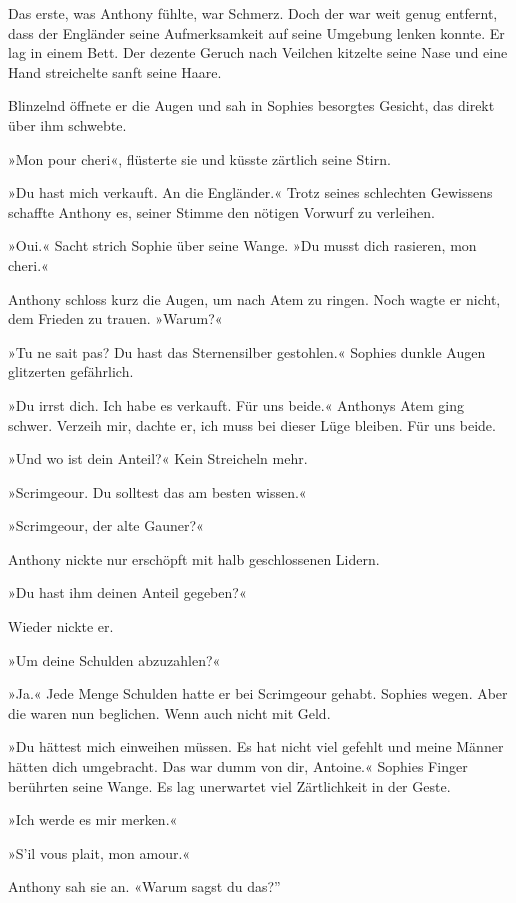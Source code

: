 \tb

Das erste, was Anthony fühlte, war Schmerz. Doch der war weit genug
entfernt, dass der Engländer seine Aufmerksamkeit auf seine
Umgebung lenken konnte. Er lag in einem Bett. Der dezente Geruch
nach Veilchen kitzelte seine Nase und eine Hand streichelte sanft
seine Haare.

Blinzelnd öffnete er die Augen und sah in Sophies besorgtes
Gesicht, das direkt über ihm schwebte.

»Mon pour cheri«, flüsterte sie und küsste zärtlich seine Stirn.

»Du hast mich verkauft. An die Engländer.« Trotz seines schlechten
Gewissens schaffte Anthony es, seiner Stimme den nötigen Vorwurf zu
verleihen.

»Oui.« Sacht strich Sophie über seine Wange. »Du musst dich
rasieren, mon cheri.«

Anthony schloss kurz die Augen, um nach Atem zu ringen. Noch wagte
er nicht, dem Frieden zu trauen. »Warum?«

»Tu ne sait pas? Du hast das Sternensilber gestohlen.« Sophies
dunkle Augen glitzerten gefährlich.

»Du irrst dich. Ich habe es verkauft. Für uns beide.« Anthonys Atem
ging schwer. Verzeih mir, dachte er, ich muss bei dieser Lüge
bleiben. Für uns beide.

»Und wo ist dein Anteil?« Kein Streicheln mehr.

»Scrimgeour. Du solltest das am besten wissen.«

»Scrimgeour, der alte Gauner?«

Anthony nickte nur erschöpft mit halb geschlossenen Lidern.

»Du hast ihm deinen Anteil gegeben?«

Wieder nickte er.

»Um deine Schulden abzuzahlen?«

»Ja.« Jede Menge Schulden hatte er bei Scrimgeour gehabt. Sophies
wegen. Aber die waren nun beglichen. Wenn auch nicht mit Geld.

»Du hättest mich einweihen müssen. Es hat nicht viel gefehlt und
meine Männer hätten dich umgebracht. Das war dumm von dir,
Antoine.« Sophies Finger berührten seine Wange. Es lag unerwartet
viel Zärtlichkeit in der Geste.

»Ich werde es mir merken.«

»S'il vous plait, mon amour.«

Anthony sah sie an. «Warum sagst du das?”

